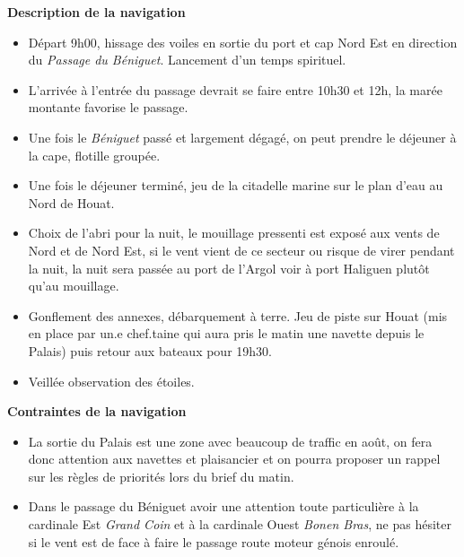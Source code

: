 \begin{minipage}[c][\textheight][t]{0.10\textwidth}
\hfill
\end{minipage}%
\begin{minipage}[c][\textheight][t]{0.50\textwidth}
    \vspace{2cm}
    \color{StrongBlue}    
    {\huge \textbf{Description de la navigation}}\\
            \begin{itemize}
                \item Départ 9h00, hissage des voiles en sortie du port et cap Nord Est en direction du \textit{Passage du Béniguet}. Lancement d'un temps spirituel. 
                \item L'arrivée à l'entrée du passage devrait se faire entre 10h30 et 12h, la marée montante favorise le passage.
                \item Une fois le \textit{Béniguet} passé et largement dégagé, on peut prendre le déjeuner à la cape, flotille groupée.
                \item Une fois le déjeuner terminé, jeu de la citadelle marine sur le plan d'eau au Nord de Houat.  
                \item Choix de l'abri pour la nuit, le mouillage pressenti est exposé aux vents de Nord et de Nord Est, si le vent vient de ce secteur ou risque de virer pendant la nuit, la nuit sera passée au port de l'Argol voir à port Haliguen plutôt qu'au mouillage. 
                \item Gonflement des annexes, débarquement à terre. Jeu de piste sur Houat (mis en place par un.e chef.taine qui aura pris le matin une navette depuis le Palais) puis retour aux bateaux pour 19h30. 
                \item Veillée observation des étoiles. 
            \end{itemize}
        {
        \huge \textbf{Contraintes de la navigation}}\\
            \begin{itemize}
                \item La sortie du Palais est une zone avec beaucoup de traffic en août, on fera donc attention aux navettes et plaisancier et on pourra proposer un rappel sur les règles de priorités lors du brief du matin.  
                \item Dans le passage du Béniguet avoir une attention toute particulière à la cardinale Est \textit{Grand Coin} et à la cardinale Ouest \textit{Bonen Bras}, ne pas hésiter si le vent est de face à faire le passage route moteur génois enroulé. 

\end{itemize}
\end{minipage}
